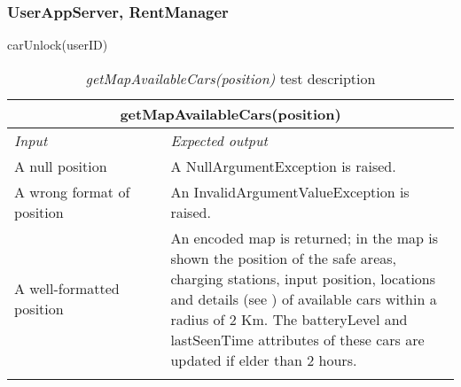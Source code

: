 \subsubsection{UserAppServer, RentManager}

carUnlock(userID) \\


\begin{longtable}{p{0.35\linewidth}p{0.65\linewidth}}
\multicolumn{2}{c}{\textbf{getMapAvailableCars(position)}} \\
\toprule
\emph{Input} & \emph{Expected output} \\
\midrule
A null position & A NullArgumentException is raised.\\
\midrule
A wrong format of position & An InvalidArgumentValueException is raised. \\
\midrule
A well-formatted position & An encoded map is returned; in the map is shown the position of the safe areas, charging stations, input position, locations and details (see \cite{DD}) of available cars within a radius of 2 Km. The batteryLevel and lastSeenTime attributes of these cars are updated if elder than 2 hours.\\
\bottomrule
\caption{\emph{getMapAvailableCars(position)} test description}
\end{longtable}


